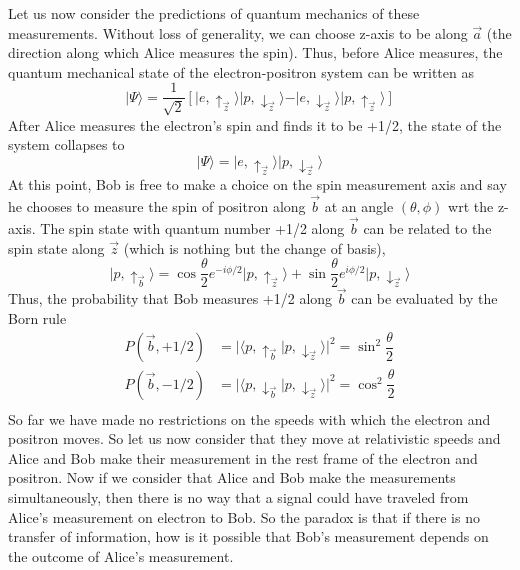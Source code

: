 \documentclass[aps,prb,onecolumn,notitlepage,showpacs,floatfix,superscriptaddress]{revtex4-1}
\begin{document}
Let us now consider the predictions of quantum mechanics of these measurements. Without loss of generality, we can choose z-axis to be along $\vec{a}$ (the direction along which Alice measures the spin). Thus, before Alice measures, the quantum mechanical state of the electron-positron system can be written as
\begin{equation}
\vert \Psi \rangle = \dfrac{1}{\sqrt{2}} \left[ \vert e, \uparrow_{\vec{z}} \rangle \vert p, \downarrow_{\vec{z}} \rangle - \vert e, \downarrow_{\vec{z}} \rangle \vert p, \uparrow_{\vec{z}} \rangle  \right] 
\end{equation}
After Alice measures the electron's spin and finds it to be +1/2, the state of the system collapses to 
\begin{equation}
\vert \Psi \rangle = \vert e, \uparrow_{\vec{z}} \rangle \vert p, \downarrow_{\vec{z}} \rangle
\end{equation}
At this point, Bob is free to make a choice on the spin measurement axis and say he chooses to measure the spin of positron along $\vec{b}$ at an angle $(\theta,\phi)$ wrt the z-axis. The spin state with quantum number +1/2 along $\vec{b}$ can be related to the spin state along $\vec{z}$ (which is nothing but the change of basis),
\begin{equation}
\vert p, \uparrow_{\vec{b}} \rangle = \cos\dfrac{\theta}{2} e^{-i\phi/2} \vert p, \uparrow_{\vec{z}} \rangle + \sin\dfrac{\theta}{2} e^{i\phi/2} \vert p, \downarrow_{\vec{z}} \rangle
\end{equation}
Thus, the probability that Bob measures +1/2 along $\vec{b}$ can be evaluated by the Born rule
\begin{equation}
\begin{split}
P(\vec{b},+1/2) &= \vert \langle p, \uparrow_{\vec{b}} \vert p, \downarrow_{\vec{z}} \rangle \vert^2 = \sin^2 \dfrac{\theta}{2} \\
P(\vec{b},-1/2) &= \vert \langle p, \downarrow_{\vec{b}} \vert p, \downarrow_{\vec{z}} \rangle \vert^2 = \cos^2 \dfrac{\theta}{2} \\
\end{split}
\end{equation}
So far we have made no restrictions on the speeds with which the electron and positron moves. So let us now consider that they move at relativistic speeds and Alice and Bob make their measurement in the rest frame of the electron and positron. Now if we consider that Alice and Bob make the measurements simultaneously, then there is no way that a signal could have traveled from Alice's measurement on electron to Bob. So the paradox is that if there is no transfer of information, how is it possible that Bob's measurement depends on the outcome of Alice's measurement. \\
\end{document}
